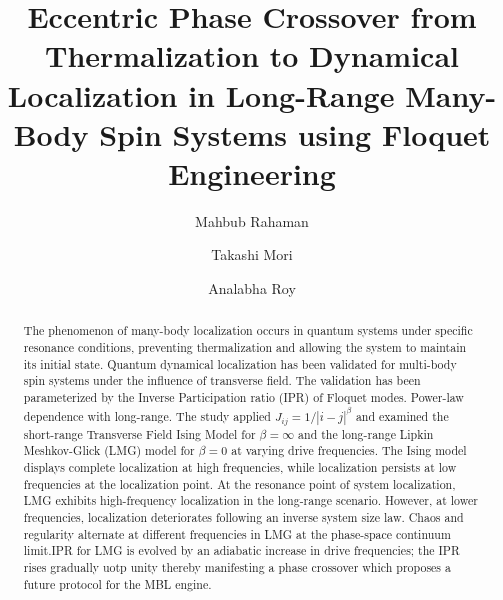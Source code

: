 \documentclass[%
reprint,
superscriptaddress,
amsmath,amssymb,
aps,
prb,
showkeys,
]{revtex4-2}
\begin{document}
	
	
	\title{Eccentric Phase Crossover from Thermalization to Dynamical Localization  in Long-Range Many-Body Spin Systems using Floquet Engineering}%
	
	\author{Mahbub Rahaman}
	\author{Takashi Mori}
	\author{Analabha Roy}
	
	\begin{abstract}
		The phenomenon of many-body localization occurs in quantum systems under specific resonance conditions, preventing thermalization and allowing the system to maintain its initial state. Quantum dynamical localization has been validated for multi-body spin systems under the influence of transverse field. The validation has been parameterized by the Inverse Participation ratio (IPR) of Floquet modes. Power-law dependence with long-range. The study applied $J_{ij} = 1/|i-j|^{\beta}$ and examined the short-range Transverse Field Ising Model for $\beta = \infty$ and the long-range Lipkin Meshkov-Glick (LMG) model for $\beta = 0$ at varying drive frequencies. The Ising model displays complete localization at high frequencies, while localization persists at low frequencies at the localization point. At the resonance point of system localization, LMG exhibits high-frequency localization in the long-range scenario. However, at lower frequencies, localization deteriorates following an inverse system size law. Chaos and regularity alternate at different frequencies in LMG at the phase-space continuum limit.IPR for LMG is evolved by an adiabatic increase in drive frequencies; the IPR rises gradually uotp unity  thereby manifesting a phase crossover which proposes a future protocol for the MBL engine.
		
	\end{abstract}
	
\end{document}
